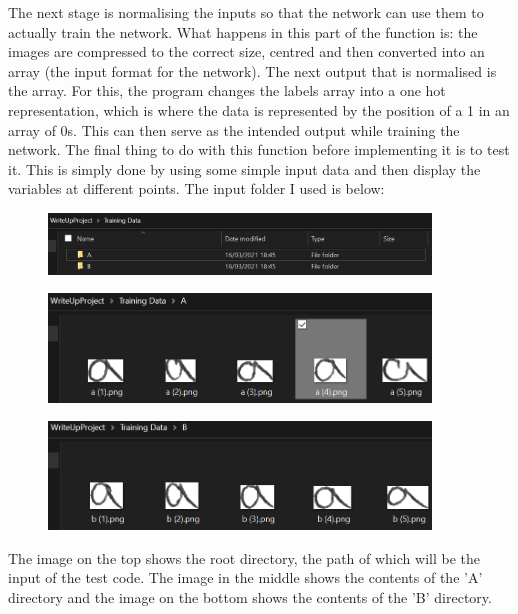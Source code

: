 \documentclass{report}
\begin{document}
\newline
The next stage is normalising the inputs so that the network can use them to actually train the network. What happens in this part of the function is: the images are compressed to the correct size, centred and then converted into an array (the input format for the network). The next output that is normalised is the  array. For this, the program changes the labels array into a one hot representation, which is where the data is represented by the position of a 1 in an array of 0s. This can then serve as the intended output while training the network.
\newline
The final thing to do with this function before implementing it is to test it. This is simply done by using some simple input data and then display the variables at different points. The input folder I used is below:
\begin{figure}[H]
    \centering
    \includegraphics[width=4in]{Images/Development and Testing/Stage 8/Run Button Testing/Test Directory/root.png}
\end{figure}
\begin{figure}[H]
    \centering
    \includegraphics[width=4in]{Images/Development and Testing/Stage 8/Run Button Testing/Test Directory/A.png}
\end{figure}
\begin{figure}[H]
    \centering
    \includegraphics[width=4in]{Images/Development and Testing/Stage 8/Run Button Testing/Test Directory/B.png}
\end{figure}
\noindent The image on the top shows the root directory, the path of which will be the input of the test code. The image in the middle shows the contents of the 'A' directory and the image on the bottom shows the contents of the 'B' directory.
\end{document}
